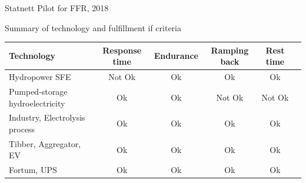 \documentclass{beamer}
\begin{document}
\begin{frame}{Statnett Pilot for FFR, 2018}
\begin{block}{Summary of technology and fulfillment if criteria}

\end{block}
{\tiny
\begin{center}
\begin{tabular}{ l c  c c c c} 
\hline
\rowcolor{Gray} Technology & Response time &Endurance & Ramping back& Rest time  \\
\hline
\hline
Hydropower SFE& Not Ok& Ok &Ok &Ok \\
\hline
\rowcolor{Gray} Pumped-storage hydroelectricity& Ok &Ok &Not Ok& Not Ok \\
\hline
Industry, Electrolysis process & Ok& Ok& Ok& Ok\\
\hline
\rowcolor{Gray} Tibber, Aggregator, EV& Ok & Ok& Ok& Ok\\
\hline
Fortum, UPS& Ok& Ok& Ok&Ok\\
\hline
\end{tabular}
\end{center}}
\end{frame}
\end{document}
